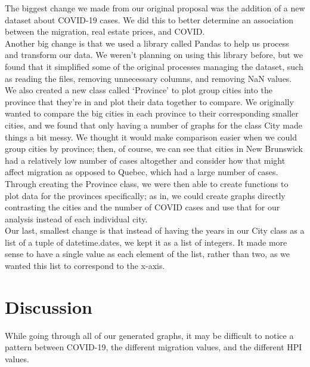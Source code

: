 \documentclass[fontsize=11pt]{article}
\begin{document}
The biggest change we made from our original proposal was the addition of a new dataset about COVID-19 cases. We did this to better determine an association between the migration, real estate prices, and COVID. \\

Another big change is that we used a library called Pandas to help us process and transform our data. We weren’t planning on using this library before, but we found that it simplified some of the original processes managing the dataset, such as reading the files, removing unnecessary columns, and removing NaN values. \\

We also created a new class called ‘Province’ to plot group cities into the province that they’re in and plot their data together to compare. We originally wanted to compare the big cities in each province to their corresponding smaller cities, and we found that only having a number of graphs for the class City made things a bit messy. We thought it would make comparison easier when we could group cities by province; then, of course, we can see that cities in New Brunswick had a relatively low number of cases altogether and consider how that might affect migration as opposed to Quebec, which had a large number of cases. \\

Through creating the Province class, we were then able to create functions to plot data for the provinces specifically; as in, we could create graphs directly contrasting the cities and the number of COVID cases and use that for our analysis instead of each individual city. \\

Our last, smallest change is that instead of having the years in our City class as a list of a tuple of datetime.dates, we kept it as a list of integers. It made more sense to have a single value as each element of the list, rather than two, as we wanted this list to correspond to the x-axis. \\

\newpage

\section{Discussion}

While going through all of our generated graphs, it may be difficult to notice a pattern between COVID-19, the different migration values, and the different HPI values. \\
\end{document}
